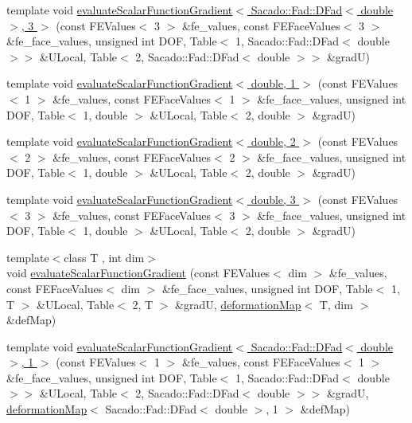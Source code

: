 \begin{DoxyCompactItemize}
\item 
template void \hyperlink{function_evaluations_8cc_aa26b2aef5debe4912a94bd082f89223e}{evaluate\-Scalar\-Function\-Gradient$<$ Sacado\-::\-Fad\-::\-D\-Fad$<$ double $>$, 3 $>$} (const F\-E\-Values$<$ 3 $>$ \&fe\-\_\-values, const F\-E\-Face\-Values$<$ 3 $>$ \&fe\-\_\-face\-\_\-values, unsigned int D\-O\-F, Table$<$ 1, Sacado\-::\-Fad\-::\-D\-Fad$<$ double $>$$>$ \&U\-Local, Table$<$ 2, Sacado\-::\-Fad\-::\-D\-Fad$<$ double $>$$>$ \&grad\-U)
\item 
template void \hyperlink{function_evaluations_8cc_a91bad8776fff0a4128d167e13f9cba03}{evaluate\-Scalar\-Function\-Gradient$<$ double, 1 $>$} (const F\-E\-Values$<$ 1 $>$ \&fe\-\_\-values, const F\-E\-Face\-Values$<$ 1 $>$ \&fe\-\_\-face\-\_\-values, unsigned int D\-O\-F, Table$<$ 1, double $>$ \&U\-Local, Table$<$ 2, double $>$ \&grad\-U)
\item 
template void \hyperlink{function_evaluations_8cc_a6a96dc1c1ba16074a76b1d809a10a3c6}{evaluate\-Scalar\-Function\-Gradient$<$ double, 2 $>$} (const F\-E\-Values$<$ 2 $>$ \&fe\-\_\-values, const F\-E\-Face\-Values$<$ 2 $>$ \&fe\-\_\-face\-\_\-values, unsigned int D\-O\-F, Table$<$ 1, double $>$ \&U\-Local, Table$<$ 2, double $>$ \&grad\-U)
\item 
template void \hyperlink{function_evaluations_8cc_a0a5f51dad78d15ef40ed772bb4eeea4c}{evaluate\-Scalar\-Function\-Gradient$<$ double, 3 $>$} (const F\-E\-Values$<$ 3 $>$ \&fe\-\_\-values, const F\-E\-Face\-Values$<$ 3 $>$ \&fe\-\_\-face\-\_\-values, unsigned int D\-O\-F, Table$<$ 1, double $>$ \&U\-Local, Table$<$ 2, double $>$ \&grad\-U)
\item 
{\footnotesize template$<$class T , int dim$>$ }\\void \hyperlink{group___evaluation_functions_gabedd4ae2841d2332ed0df0513b189e34}{evaluate\-Scalar\-Function\-Gradient} (const F\-E\-Values$<$ dim $>$ \&fe\-\_\-values, const F\-E\-Face\-Values$<$ dim $>$ \&fe\-\_\-face\-\_\-values, unsigned int D\-O\-F, Table$<$ 1, T $>$ \&U\-Local, Table$<$ 2, T $>$ \&grad\-U, \hyperlink{structdeformation_map}{deformation\-Map}$<$ T, dim $>$ \&def\-Map)
\item 
template void \hyperlink{function_evaluations_8cc_a5cba4e9f1222a7f8c1d9776c905bad20}{evaluate\-Scalar\-Function\-Gradient$<$ Sacado\-::\-Fad\-::\-D\-Fad$<$ double $>$, 1 $>$} (const F\-E\-Values$<$ 1 $>$ \&fe\-\_\-values, const F\-E\-Face\-Values$<$ 1 $>$ \&fe\-\_\-face\-\_\-values, unsigned int D\-O\-F, Table$<$ 1, Sacado\-::\-Fad\-::\-D\-Fad$<$ double $>$$>$ \&U\-Local, Table$<$ 2, Sacado\-::\-Fad\-::\-D\-Fad$<$ double $>$$>$ \&grad\-U, \hyperlink{structdeformation_map}{deformation\-Map}$<$ Sacado\-::\-Fad\-::\-D\-Fad$<$ double $>$, 1 $>$ \&def\-Map)

\end{DoxyCompactItemize}
